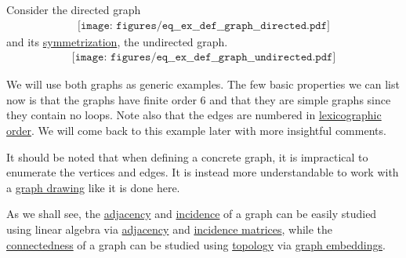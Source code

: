 \begin{example}\label{ex:def:graph}
  Consider the directed graph
  \begin{equation}\label{eq:ex:def:graph/directed}
    \begin{aligned}
      \texttt{[image: figures/eq\_\_ex\_\_def\_\_graph\_\_directed.pdf]}
    \end{aligned}
  \end{equation}
  and its \hyperref[def:graph/symmetrization]{symmetrization}, the undirected graph.
  \begin{equation}\label{eq:ex:def:graph/undirected}
    \begin{aligned}
      \texttt{[image: figures/eq\_\_ex\_\_def\_\_graph\_\_undirected.pdf]}
    \end{aligned}
  \end{equation}

  We will use both graphs as generic examples. The few basic properties we can list now is that the graphs have finite order \( 6 \) and that they are simple graphs since they contain no loops. Note also that the edges are numbered in \hyperref[eq:def:lexicographic_order]{lexicographic order}. We will come back to this example later with more insightful comments.

  It should be noted that when defining a concrete graph, it is impractical to enumerate the vertices and edges. It is instead more understandable to work with a \hyperref[def:graph_geometric_realization/drawing]{graph drawing} like it is done here.
\end{example}

\begin{remark}\label{rem:graphs_linear_algebra_and_topology}
  As we shall see, the \hyperref[def:graph]{adjacency} and \hyperref[def:graph_incidence]{incidence} of a graph can be easily studied using linear algebra via \hyperref[def:graph_matrices/adjacency]{adjacency} and \hyperref[def:graph_matrices/incidence]{incidence matrices}, while the \hyperref[def:graph_connectedness]{connectedness} of a graph can be studied using \hyperref[def:graph_connectedness]{topology} via \hyperref[def:graph_geometric_relization/embedding]{graph embeddings}.
\end{remark}

